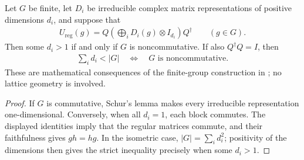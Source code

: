 \begin{lemma}%
    \label{thm:peps_regular_matrix_commutativity}
    \leanok
    Let $G$ be finite, let $D_i$ be irreducible complex matrix
    representations of positive dimensions $d_i$, and suppose that
    \begin{align}
        U_{\mathrm{reg}}(g)
        =Q\left(\bigoplus_iD_i(g)\otimes I_{d_i}\right)Q^\dagger
        \qquad(g\in G).
    \end{align}
    Then some $d_i>1$ if and only if $G$ is noncommutative.
    If also $Q^\dagger Q=I$, then
    \begin{align}
        \sum_i d_i<|G|
        \quad\Longleftrightarrow\quad G\text{ is noncommutative}.
    \end{align}
    These are mathematical consequences of the finite-group construction
    in \cite[Section~7]{Schuch2010PEPS}; no lattice geometry is involved.
\end{lemma}
\begin{proof}\leanok
    If $G$ is commutative, Schur's lemma makes every irreducible
    representation one-dimensional. Conversely, when all $d_i=1$,
    each block commutes. The displayed identities imply that the
    regular matrices commute, and their faithfulness gives $gh=hg$.
    In the isometric case, $|G|=\sum_i d_i^2$; positivity of the
    dimensions then gives the strict inequality precisely when
    some $d_i>1$.
\end{proof}
